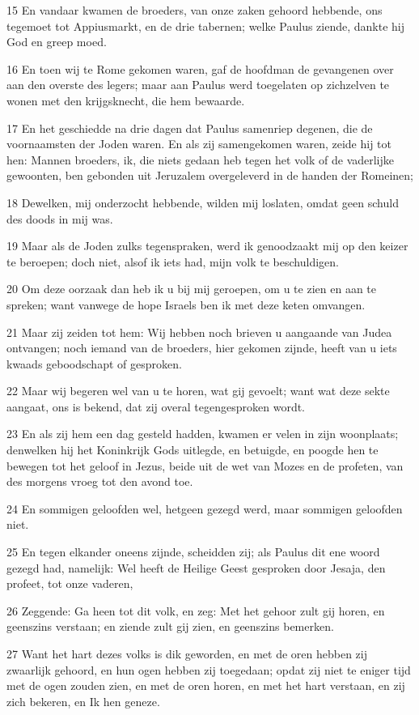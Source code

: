\par 15 En vandaar kwamen de broeders, van onze zaken gehoord hebbende, ons tegemoet tot Appiusmarkt, en de drie tabernen; welke Paulus ziende, dankte hij God en greep moed.
\par 16 En toen wij te Rome gekomen waren, gaf de hoofdman de gevangenen over aan den overste des legers; maar aan Paulus werd toegelaten op zichzelven te wonen met den krijgsknecht, die hem bewaarde.
\par 17 En het geschiedde na drie dagen dat Paulus samenriep degenen, die de voornaamsten der Joden waren. En als zij samengekomen waren, zeide hij tot hen: Mannen broeders, ik, die niets gedaan heb tegen het volk of de vaderlijke gewoonten, ben gebonden uit Jeruzalem overgeleverd in de handen der Romeinen;
\par 18 Dewelken, mij onderzocht hebbende, wilden mij loslaten, omdat geen schuld des doods in mij was.
\par 19 Maar als de Joden zulks tegenspraken, werd ik genoodzaakt mij op den keizer te beroepen; doch niet, alsof ik iets had, mijn volk te beschuldigen.
\par 20 Om deze oorzaak dan heb ik u bij mij geroepen, om u te zien en aan te spreken; want vanwege de hope Israels ben ik met deze keten omvangen.
\par 21 Maar zij zeiden tot hem: Wij hebben noch brieven u aangaande van Judea ontvangen; noch iemand van de broeders, hier gekomen zijnde, heeft van u iets kwaads geboodschapt of gesproken.
\par 22 Maar wij begeren wel van u te horen, wat gij gevoelt; want wat deze sekte aangaat, ons is bekend, dat zij overal tegengesproken wordt.
\par 23 En als zij hem een dag gesteld hadden, kwamen er velen in zijn woonplaats; denwelken hij het Koninkrijk Gods uitlegde, en betuigde, en poogde hen te bewegen tot het geloof in Jezus, beide uit de wet van Mozes en de profeten, van des morgens vroeg tot den avond toe.
\par 24 En sommigen geloofden wel, hetgeen gezegd werd, maar sommigen geloofden niet.
\par 25 En tegen elkander oneens zijnde, scheidden zij; als Paulus dit ene woord gezegd had, namelijk: Wel heeft de Heilige Geest gesproken door Jesaja, den profeet, tot onze vaderen,
\par 26 Zeggende: Ga heen tot dit volk, en zeg: Met het gehoor zult gij horen, en geenszins verstaan; en ziende zult gij zien, en geenszins bemerken.
\par 27 Want het hart dezes volks is dik geworden, en met de oren hebben zij zwaarlijk gehoord, en hun ogen hebben zij toegedaan; opdat zij niet te eniger tijd met de ogen zouden zien, en met de oren horen, en met het hart verstaan, en zij zich bekeren, en Ik hen geneze.
